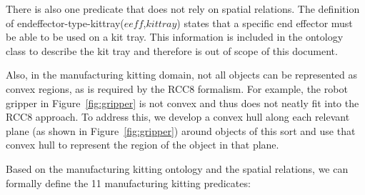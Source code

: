 \documentclass[final,1p,times]{elsarticle}
\newcommand{\const}[1] {$\mathit{#1}$}
\newcommand{\stvar}[1] {\textsf{#1}}
\begin{document}
There is also one predicate that does not rely on spatial relations. The definition of \stvar{endeffector-type-kittray}(\const{eeff},\const{kittray}) states that a specific end effector must be able to be used on a kit tray. This information is included in the ontology class to describe the kit tray and therefore is out of scope of this document.

Also, in the manufacturing kitting domain, not all objects can be represented as convex regions, as is required by the RCC8 formalism. For example, the robot gripper in Figure~\ref{fig:gripper} is not convex and thus does not neatly fit into the RCC8 approach. To address this, we develop a convex hull along each relevant plane (as shown in Figure~\ref{fig:gripper}) around objects of this sort and use that convex hull to represent the region of the object in that plane.

Based on the manufacturing kitting ontology and the spatial relations, we can formally define the 11 manufacturing kitting predicates:
\end{document}

